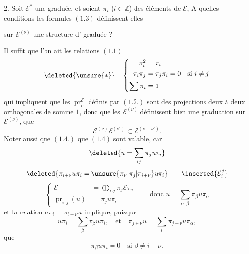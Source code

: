 2. Soit $\mathcal E^*$ une  graduée, et soient $\pi_i$ ($i\in\mathbb Z$) des éléments de $\mathcal E$,  A quelles conditions les formules $(1.3)$ définissent-elles

sur $\mathcal E^{(\nu)}$ une structure d' graduée ?

Il suffit que l'on ait les relations $(1.1)$
\[
\deleted{\unsure{*}}\quad\left\{\begin{aligned}
\pi_i^2&=\pi_i\\
\pi_i\pi_j&=\pi_j\pi_i=0\quad\text{si }i\neq j\\
\sum\pi_i&=1
\end{aligned}\right.
\]
qui impliquent que les $\operatorname{pr}_{\nu}^{\mathcal E}$ définis par $(1.2.)$ sont des projections deux à deux orthogonales de somme $1$, donc que les $\mathcal E^{(\nu)}$ définissent bien une graduation  sur $\mathcal E^{(\nu)}$,  que
\[
\mathcal E^{(\nu)}\mathcal E^{(\nu')}\subset\mathcal E^{(\nu-\nu')}.
\]
Noter aussi que $(1.4.)$ que $(1.4)$ sont valable, car 
\[
\deleted{u=\sum_{ij}\pi_j u\pi_i}
\]
\[
\deleted{\pi_{i+\nu}u\pi_i=\unsure{\pi_\nu|\pi_j|\pi_{i+\nu}}u\pi_i}
\qquad\inserted{\mathcal E_i^j}
\]
\[
\left\{\begin{aligned}
\mathcal E&=\bigoplus_{i,j}\pi_j\mathcal E\pi_i\\
\operatorname{pr}_{i,j}(u)&=\pi_j u\pi_i
\end{aligned}\right.
\qquad\text{donc }u=\sum_{\alpha,\beta}\pi_\beta u\pi_\alpha
\]
et la relation $u\pi_i=\pi_{i+\nu}u$ implique, puisque
\[
u\pi_i=\sum_\beta\pi_\beta u\pi_i,\quad\text{et}\quad
\pi_{j+\nu}u=\sum_i\pi_{j+\nu}u\pi_\alpha,
\]
que
\[
\pi_\beta u\pi_i=0\quad\text{si }\beta\neq i+\nu.
\]


